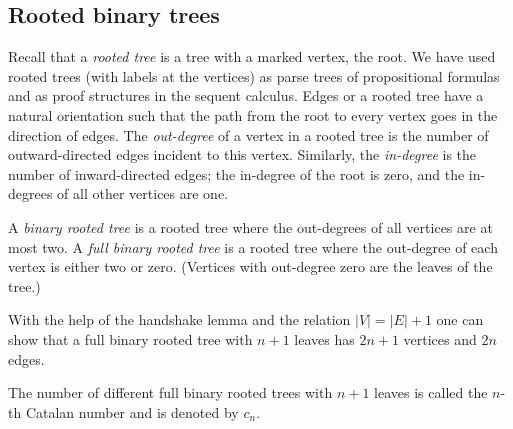 \begin{page}
\setcounter{section}{4}
\setcounter{subsection}{1}
\setcounter{dfn}{0}
\label{portion:856}

\subsection{Rooted binary trees}
Recall that a \emph{rooted tree} is a tree with a marked vertex, the root.
We have used rooted trees (with labels at the vertices) as parse trees of propositional formulas
and as proof structures in the sequent calculus.
Edges or a rooted tree have a natural orientation such that the path from the root to every vertex goes in the direction of edges.
The \emph{out-degree} of a vertex in a rooted tree is the number of outward-directed edges incident to this vertex.
Similarly, the \emph{in-degree} is the number of inward-directed edges; the in-degree of the root is zero, and the in-degrees of all other vertices are one.

A \emph{binary rooted tree} is a rooted tree where the out-degrees of all vertices are at most two.
A \emph{full binary rooted tree} is a rooted tree where the out-degree of each vertex is either two or zero.
(Vertices with out-degree zero are the leaves of the tree.)

With the help of the handshake lemma and the relation $|V| = |E| + 1$ one can show that
a full binary rooted tree with $n+1$ leaves has $2n+1$ vertices and $2n$ edges.


\end{page}

\begin{page}
\setcounter{section}{4}
\setcounter{subsection}{1}
\setcounter{dfn}{1}
\label{portion:858}

\begin{dfn}
The number of different full binary rooted trees with $n+1$ leaves is called the $n$-th Catalan number and is denoted by $c_n$.
\end{dfn}

\end{page}

